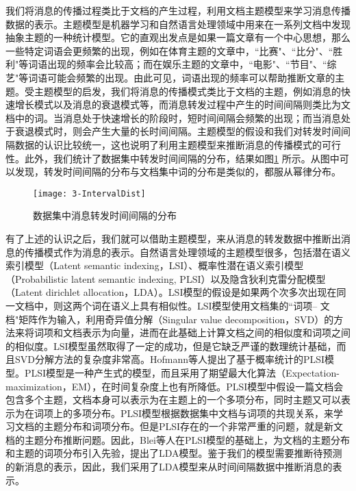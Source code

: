 我们将消息的传播过程类比于文档的产生过程，利用文档主题模型来学习消息传播数据的表示。主题模型是机器学习和自然语言处理领域中用来在一系列文档中发现抽象主题的一种统计模型。它的直观出发点是如果一篇文章有一个中心思想，那么一些特定词语会更频繁的出现，例如在体育主题的文章中，``比赛"、``比分"、``胜利"等词语出现的频率会比较高；而在娱乐主题的文章中，``电影"、``节目"、``综艺"等词语可能会频繁的出现。由此可见，词语出现的频率可以帮助推断文章的主题。受主题模型的启发，我们将消息的传播模式类比于文档的主题，例如消息的快速增长模式以及消息的衰退模式等，而消息转发过程中产生的时间间隔则类比为文档中的词。当消息处于快速增长的阶段时，短时间间隔会频繁的出现；而当消息处于衰退模式时，则会产生大量的长时间间隔。主题模型的假设和我们对转发时间间隔数据的认识比较统一，这也说明了利用主题模型来推断消息的传播模式的可行性。此外，我们统计了数据集中转发时间间隔的分布，结果如图\ref{fig:intervalDist} 所示。从图中可以发现，转发时间间隔的分布与文档集中词的分布是类似的，都服从幂律分布。
\begin{figure}[!htbp]
  \centering
  \texttt{[image: 3-IntervalDist]}
  \caption{数据集中消息转发时间间隔的分布}
  \label{fig:intervalDist}
\end{figure}

有了上述的认识之后，我们就可以借助主题模型，来从消息的转发数据中推断出消息的传播模式作为消息的表示。自然语言处理领域的主题模型很多，包括潜在语义索引模型（Latent semantic indexing，LSI）\citep{papadimitriou1998latent}、概率性潜在语义索引模型（Probabilistic latent semantic indexing, PLSI）\citep{hofmann1999probabilistic}以及隐含狄利克雷分配模型（Latent dirichlet allocation，LDA）\citep{blei2003latent}。LSI模型的假设是如果两个次多次出现在同一文档中，则这两个词在语义上具有相似性。LSI模型使用文档集的``词项-- 文档"矩阵作为输入，利用奇异值分解（Singular value decomposition，SVD）\citep{golub1970singular}的方法来将词项和文档表示为向量，进而在此基础上计算文档之间的相似度和词项之间的相似度。LSI模型虽然取得了一定的成功，但是它缺乏严谨的数理统计基础，而且SVD分解方法的复杂度非常高。Hofmann等人提出了基于概率统计的PLSI模型。PLSI模型是一种产生式的模型，而且采用了期望最大化算法（Expectation-maximization，EM）\citep{moon1996expectation}，在时间复杂度上也有所降低。PLSI模型中假设一篇文档会包含多个主题，文档本身可以表示为在主题上的一个多项分布，同时主题又可以表示为在词项上的多项分布。PLSI模型根据数据集中文档与词项的共现关系，来学习文档的主题分布和词项分布。但是PLSI存在的一个非常严重的问题，就是新文档的主题分布推断问题。因此，Blei等人在PLSI模型的基础上，为文档的主题分布和主题的词项分布引入先验，提出了LDA模型。鉴于我们的模型需要推断待预测的新消息的表示，因此，我们采用了LDA模型来从时间间隔数据中推断消息的表示。

